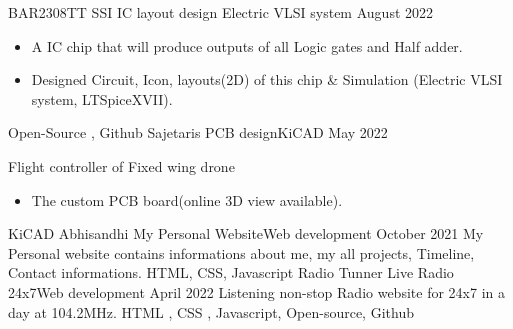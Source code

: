 %
%
%

\begin{experiences}
  \experience
    {BAR2308TT}   {SSI IC layout design }{Electric VLSI system}{}
    {August 2022} {
                      \begin{itemize}
                       \item A IC chip that will produce outputs of all Logic gates and Half adder.
                       \item Designed Circuit, Icon, layouts(2D) of this chip \& Simulation (Electric VLSI system, LTSpiceXVII).
                      \end{itemize}
                    }
                    {Open-Source , Github}
  \emptySeparator
  \experience
    {Sajetaris} {PCB design}{KiCAD}{}
    {May 2022}    {
                   Flight controller of Fixed wing drone
                    \begin{itemize}
                       \item The custom PCB board(online 3D view available).
                      \end{itemize}
                    }
                    {KiCAD}
  \emptySeparator
  \experience
    {Abhisandhi}     {My Personal Website}{Web development}{}
    {October 2021}    {
                     My Personal website contains informations about me, my all projects, Timeline, Contact informations.
                    }
                    { HTML, CSS, Javascript}
  \emptySeparator
 \experience
    {Radio Tunner}   {Live Radio 24x7}{Web development}{}
    {April 2022} {
                      Listening non-stop Radio website for 24x7 in a day at 104.2MHz.
                    }
                    {HTML , CSS , Javascript, Open-source, Github}
\end{experiences}
